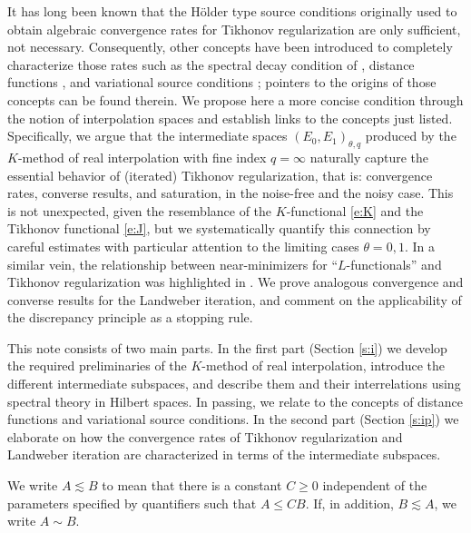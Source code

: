 \documentclass[10pt, a4paper]{iopart}
\theoremstyle{remark}
\theoremstyle{definition}
\begin{document}
It has long been known
that 
the H\"older type 
source conditions 
originally used
to obtain algebraic convergence rates
for Tikhonov regularization
are only sufficient,
not necessary.
%
Consequently,
other concepts 
have been introduced 
to completely characterize those rates
%
%
such as 
the spectral decay condition of \cite[Theorem 2.1]{Neubauer1997},
distance functions \cite[p.3]{FlemmingHofmannMathe2011}, 
and
variational source conditions 
\cite{Flemming2012};
pointers to the origins of those concepts can be found therein.
%
%
We propose here a more concise condition
through 
the notion of interpolation spaces
and 
establish links 
to the concepts just listed.
%
Specifically,
we argue that
the intermediate spaces
$(E_0, E_1)_{\theta, q}$
produced by the $K$-method of real interpolation
\cite{BerghLofstrom1976, BennettSharpley1988}
with fine index $q = \infty$
naturally capture 
the essential behavior
of (iterated) Tikhonov regularization,
that is:
convergence rates, converse results, and saturation,
in the noise-free and the noisy case.
%
This is not unexpected, given 
the resemblance of the $K$-functional \eqref{e:K}
and 
the Tikhonov functional \eqref{e:J},
but we systematically quantify this connection
by careful estimates
with particular attention to the limiting cases
$\theta = 0, 1$.
%
In a similar vein, 
the relationship between near-minimizers for ``$L$-functionals''
and
Tikhonov regularization
was highlighted
in \cite[Chapter 6]{KislyakovKruglyak2013}.
%
%
%
We prove analogous convergence and converse results for 
the Landweber iteration,
and comment on the applicability of the discrepancy principle
as a stopping rule.


%

This note consists of two main parts.
%
In the first part (Section \ref{s:i})
we develop the required preliminaries
of the $K$-method of real interpolation,
introduce the different intermediate subspaces,
and describe them and their interrelations using 
spectral theory in Hilbert spaces.
%
In passing, we relate
to the concepts of distance functions 
and 
variational source conditions.
%
%
In the second part (Section \ref{s:ip})
we elaborate on how
the convergence rates of
Tikhonov regularization
and
Landweber iteration
are characterized 
in terms of the intermediate subspaces.

%

We write $A \lesssim B$
to mean that there is a constant $C \geq 0$ 
independent of the parameters specified by quantifiers
such that $A \leq C B$.
%
If, in addition, $B \lesssim A$, we write $A \sim B$.
\end{document}
